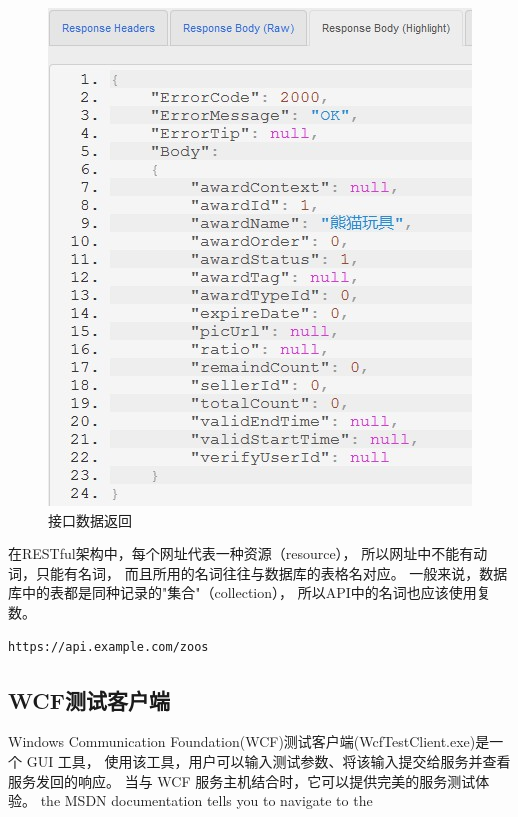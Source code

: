 \documentclass{book}
\begin{document}
\begin{figure}[htbp]
	\centering
	\includegraphics[scale=0.8]{ReturnJsonDemo.jpg}
	\caption{接口数据返回}
	\label{fig:ReturnJsonDemo}
\end{figure}

在RESTful架构中，每个网址代表一种资源（resource），
所以网址中不能有动词，只能有名词，
而且所用的名词往往与数据库的表格名对应。
一般来说，数据库中的表都是同种记录的"集合"（collection），
所以API中的名词也应该使用复数。

\begin{lstlisting}[language=HTML]
https://api.example.com/zoos
\end{lstlisting}

\subsection{WCF测试客户端}

Windows Communication Foundation(WCF)测试客户端(WcfTestClient.exe)是一个 GUI 工具，
使用该工具，用户可以输入测试参数、将该输入提交给服务并查看服务发回的响应。
当与 WCF 服务主机结合时，它可以提供完美的服务测试体验。
the MSDN documentation tells you to navigate to the 

\begin{lstlisting}[language=Bash]
%SystemDrive%\Program Files\Microsoft Visual Studio 10.0\Common7\IDE
\end{lstlisting}
\end{document}
